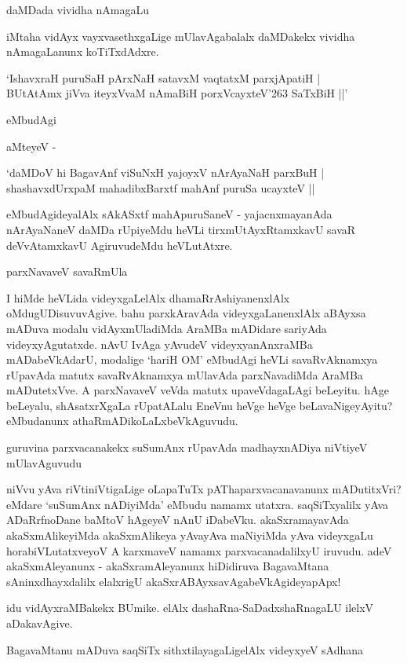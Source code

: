 daMDada vividha nAmagaLu

iMtaha vidAyx vayxvasethxgaLige mUlavAgabalalx daMDakekx vividha nAmagaLanunx koTiTxdAdxre.

\begin{shloka}
`IshavxraH puruSaH pArxNaH satavxM vaqtatxM parxjApatiH |\\
BUtAtAmx jiVva iteyxVvaM nAmaBiH porxVcayxteV\char'263 SaTxBiH ||'
\end{shloka}

eMbudAgi

aMteyeV -

\begin{shloka}
`daMDoV hi BagavAnf viSuNxH yajoyxV nArAyaNaH parxBuH |\\
shashavxdUrxpaM mahadibxBarxtf mahAnf puruSa ucayxteV ||
\end{shloka}

eMbudAgideyalAlx sAkASxtf mahApuruSaneV - yajacnxmayanAda nArAyaNaneV daMDa rUpiyeMdu heVLi tirxmUtAyxRtamxkavU savaR deVvAtamxkavU AgiruvudeMdu heVLutAtxre.

parxNavaveV savaRmUla

I hiMde heVLida videyxgaLelAlx dhamaRrAshiyanenxlAlx oMdugUDisuvuvAgive. bahu parxkAravAda videyxgaLanenxlAlx aBAyxsa mADuva modalu vidAyxmUladiMda AraMBa mADidare sariyAda videyxyAgutatxde. nAvU IvAga yAvudeV videyxyanAnxraMBa mADabeVkAdarU, modalige `hariH OM' eMbudAgi heVLi savaRvAknamxya rUpavAda matutx savaRvAknamxya mUlavAda parxNavadiMda AraMBa mADutetxVve. A parxNavaveV veVda matutx upaveVdagaLAgi beLeyitu. hAge beLeyalu, shAsatxrXgaLa rUpatALalu EneVnu heVge heVge beLavaNigeyAyitu? eMbudanunx athaRmADikoLaLxbeVkAguvudu.

guruvina parxvacanakekx suSumAnx rUpavAda madhayxnADiya niVtiyeV mUlavAguvudu

niVvu yAva riVtiniVtigaLige oLapaTuTx pAThaparxvacanavanunx mADutitxVri? eMdare `suSumAnx nADiyiMda' eMbudu namamx utatxra. saqSiTxyalilx yAva ADaRrfnoDane baMtoV hAgeyeV nAnU iDabeVku. akaSxramayavAda akaSxmAlikeyiMda akaSxmAlikeya yAvayAva maNiyiMda yAva videyxgaLu horabiVLutatxveyoV A karxmaveV namamx parxvacanadalilxyU iruvudu. adeV akaSxmAleyanunx - akaSxramAleyanunx hiDidiruva BagavaMtana sAninxdhayxdalilx elalxrigU akaSxrABAyxsavAgabeVkAgideyapApx!

idu vidAyxraMBakekx BUmike. elAlx dashaRna-SaDadxshaRnagaLU ilelxV aDakavAgive.

BagavaMtanu mADuva saqSiTx sithxtilayagaLigelAlx videyxyeV sAdhana

